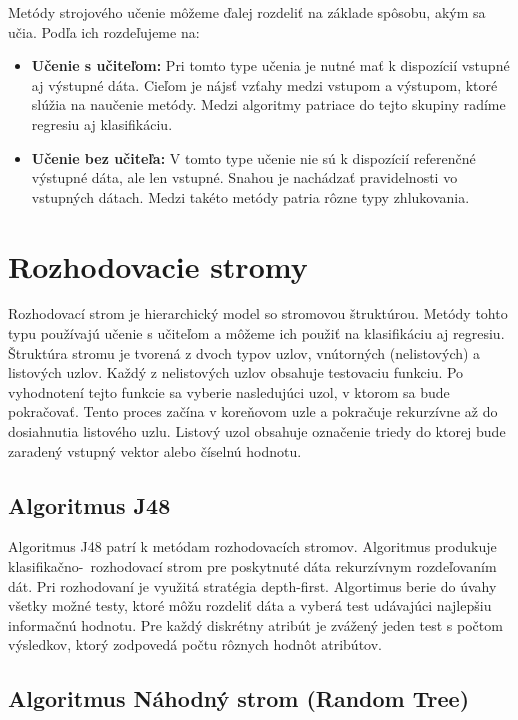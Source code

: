 Metódy strojového učenie môžeme ďalej rozdeliť na základe spôsobu, akým sa učia. Podľa \cite{alpaydin} ich rozdeľujeme na:
\begin{itemize}
	\item \textbf{Učenie s učiteľom:} Pri tomto type učenia je nutné mať k dispozícií vstupné aj výstupné dáta. Cieľom je nájsť vzťahy medzi vstupom a výstupom, ktoré slúžia na naučenie metódy. Medzi algoritmy patriace do tejto skupiny radíme regresiu aj klasifikáciu.
	\item \textbf{Učenie bez učiteľa:} V tomto type učenie nie sú k dispozícií referenčné výstupné dáta, ale len vstupné. Snahou je nachádzať pravidelnosti vo vstupných dátach. Medzi takéto metódy patria rôzne typy zhlukovania. 
\end{itemize}

\section {Rozhodovacie stromy}
Rozhodovací strom je hierarchický model so stromovou štruktúrou. Metódy tohto typu používajú učenie s učiteľom a môžeme ich použiť na klasifikáciu aj regresiu. Štruktúra stromu je tvorená z dvoch typov uzlov, vnútorných (nelistových) a listových uzlov. Každý z nelistových uzlov obsahuje testovaciu funkciu. Po vyhodnotení tejto funkcie sa vyberie nasledujúci uzol, v ktorom sa bude pokračovať. Tento proces začína v koreňovom uzle a pokračuje rekurzívne až do dosiahnutia listového uzlu. Listový uzol obsahuje označenie triedy do ktorej bude zaradený vstupný vektor alebo číselnú hodnotu.

\subsection{Algoritmus J48}

Algoritmus J48 patrí k metódam rozhodovacích stromov. Algoritmus produkuje klasifikačno-~rozhodovací strom pre poskytnuté dáta rekurzívnym rozdeľovaním dát. Pri rozhodovaní je využitá stratégia depth-first. Algortimus berie do úvahy všetky možné testy, ktoré môžu rozdeliť dáta a vyberá test udávajúci najlepšiu informačnú hodnotu. Pre každý diskrétny atribút je zvážený jeden test s počtom výsledkov, ktorý zodpovedá počtu rôznych hodnôt atribútov. 

\subsection{Algoritmus Náhodný strom (Random Tree)}

